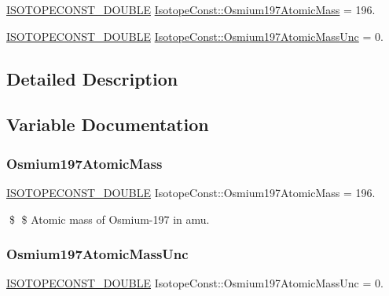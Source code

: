 \begin{DoxyCompactItemize}
\item 
\mbox{\hyperlink{group___isotope_const-_macros_ga8f45a7272ce02c0b4c65c44636ed719a}{I\+S\+O\+T\+O\+P\+E\+C\+O\+N\+S\+T\+\_\+\+D\+O\+U\+B\+LE}} \mbox{\hyperlink{group___isotope_const-_osmium-_os197_ga67d4a5c5704610c3d3f621515740f2dc}{Isotope\+Const\+::\+Osmium197\+Atomic\+Mass}} = 196.
\item 
\mbox{\hyperlink{group___isotope_const-_macros_ga8f45a7272ce02c0b4c65c44636ed719a}{I\+S\+O\+T\+O\+P\+E\+C\+O\+N\+S\+T\+\_\+\+D\+O\+U\+B\+LE}} \mbox{\hyperlink{group___isotope_const-_osmium-_os197_gae51334cd4dea8ee14f8f1d42774a8724}{Isotope\+Const\+::\+Osmium197\+Atomic\+Mass\+Unc}} = 0.
\end{DoxyCompactItemize}


\subsection{Detailed Description}


\subsection{Variable Documentation}
\mbox{\label{group___isotope_const-_osmium-_os197_ga67d4a5c5704610c3d3f621515740f2dc}} 
\subsubsection{\texorpdfstring{Osmium197\+Atomic\+Mass}{Osmium197AtomicMass}}
{\footnotesize\ttfamily \mbox{\hyperlink{group___isotope_const-_macros_ga8f45a7272ce02c0b4c65c44636ed719a}{I\+S\+O\+T\+O\+P\+E\+C\+O\+N\+S\+T\+\_\+\+D\+O\+U\+B\+LE}} Isotope\+Const\+::\+Osmium197\+Atomic\+Mass = 196.}

\$ \$ Atomic mass of Osmium-\/197 in amu. \mbox{\label{group___isotope_const-_osmium-_os197_gae51334cd4dea8ee14f8f1d42774a8724}} 
\subsubsection{\texorpdfstring{Osmium197\+Atomic\+Mass\+Unc}{Osmium197AtomicMassUnc}}
{\footnotesize\ttfamily \mbox{\hyperlink{group___isotope_const-_macros_ga8f45a7272ce02c0b4c65c44636ed719a}{I\+S\+O\+T\+O\+P\+E\+C\+O\+N\+S\+T\+\_\+\+D\+O\+U\+B\+LE}} Isotope\+Const\+::\+Osmium197\+Atomic\+Mass\+Unc = 0.}

